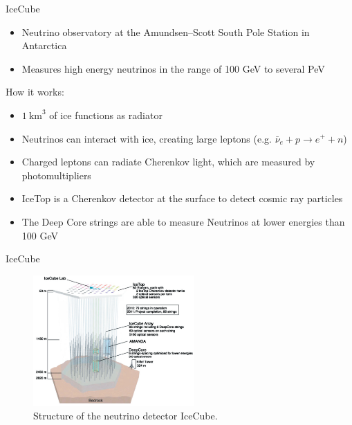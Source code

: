\documentclass[aspectratio=1610, 10pt]{beamer}
\begin{document}
\begin{frame}{IceCube}
  \begin{itemize}
    \item Neutrino observatory at the Amundsen–Scott South Pole Station in Antarctica
    \medskip
    \item Measures high energy neutrinos in the range of 100 GeV to several PeV
  \end{itemize}
\vspace{0.5cm}
  How it works:
  \begin{itemize}
    \item $1 \: \mathrm{km}^3$ of ice functions as radiator
    \medskip
    \item Neutrinos can interact with ice, creating large leptons (e.g. $\bar{\nu}_e + p \rightarrow e^{+} + n$)
    \medskip
    \item Charged leptons can radiate Cherenkov light, which are measured by photomultipliers
    \medskip
    \item IceTop is a Cherenkov detector at the surface to detect cosmic ray particles
    \medskip
    \item The Deep Core strings are able to measure Neutrinos at lower energies than 100 GeV
  \end{itemize}
\end{frame}

\begin{frame}{IceCube}
  \begin{figure}
    \includegraphics[width=0.55\textwidth]{images/icecube.png}
    \caption{Structure of the neutrino detector IceCube.}
  \end{figure}
\end{frame}
\end{document}
